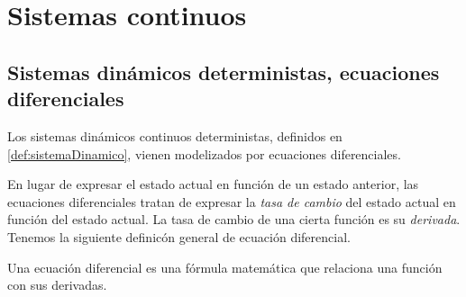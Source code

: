 
\section{Sistemas continuos}

\subsection{Sistemas dinámicos deterministas, ecuaciones diferenciales}

Los sistemas dinámicos continuos deterministas, definidos en \ref{def:sistemaDinamico}, vienen modelizados por ecuaciones diferenciales.

En lugar de expresar el estado actual en función de un estado anterior, las ecuaciones diferenciales tratan de expresar la \emph{tasa de cambio} del estado actual en función del estado actual. La tasa de cambio de una cierta función es su \emph{derivada}. Tenemos la siguiente definicón general de ecuación diferencial.

\begin{definition}
Una ecuación diferencial es una fórmula matemática que relaciona una función con sus derivadas.
\end{definition}

